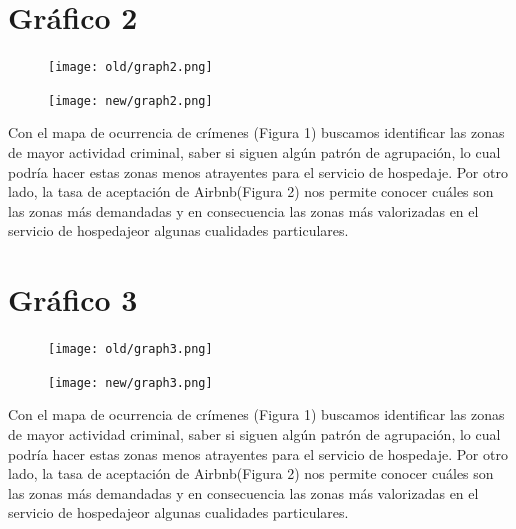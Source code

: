 \documentclass[11pt,a4paper]{article}
\begin{document}
\clearpage
\section{Gráfico 2}

\begin{figure}[!h]
    \centering
    \texttt{[image: old/graph2.png]}
\end{figure}

\begin{figure}[!h]
    \centering
    \texttt{[image: new/graph2.png]}
\end{figure}
Con el mapa de ocurrencia de crímenes (Figura 1) buscamos identificar las zonas de mayor actividad criminal, saber si siguen algún patrón de agrupación, lo cual podría hacer estas zonas menos atrayentes para el servicio de hospedaje. Por otro lado, la tasa de aceptación de Airbnb(Figura 2) nos permite conocer cuáles son las zonas más demandadas y en consecuencia las zonas más valorizadas en el servicio de hospedajeor algunas cualidades particulares. 

\clearpage
\section{Gráfico 3}

\begin{figure}[!h]
    \centering
    \texttt{[image: old/graph3.png]}
\end{figure}

\begin{figure}[!h]
    \centering
    \texttt{[image: new/graph3.png]}
\end{figure}


Con el mapa de ocurrencia de crímenes (Figura 1) buscamos identificar las zonas de mayor actividad criminal, saber si siguen algún patrón de agrupación, lo cual podría hacer estas zonas menos atrayentes para el servicio de hospedaje. Por otro lado, la tasa de aceptación de Airbnb(Figura 2) nos permite conocer cuáles son las zonas más demandadas y en consecuencia las zonas más valorizadas en el servicio de hospedajeor algunas cualidades particulares. 
\end{document}
